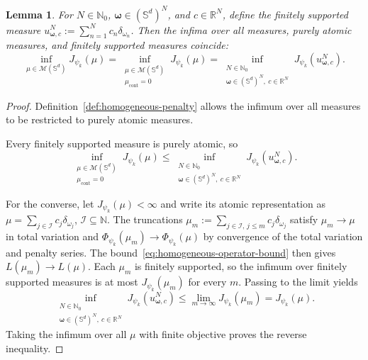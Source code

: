 \documentclass[11pt]{amsart}
\newtheorem{lemma}[theorem]{Lemma}
\theoremstyle{definition}
\theoremstyle{remark}
\DeclareMathOperator{\cont}{cont}
\begin{document}
\begin{lemma}
\label{lem:homogeneous_reduction}
For $N\in\mathbb N_0$, $\boldsymbol\omega\in(\mathbb S^d)^N$, and
$c\in\mathbb R^N$, define the finitely supported measure
$u^N_{\boldsymbol\omega,c}:=\sum_{n=1}^Nc_n\delta_{\omega_n}$.
Then the infima over all measures, purely atomic measures, and finitely
supported measures coincide:
\begin{equation}
\label{eq:homogeneous-infima}
	\inf_{\mu\in\mathcal M(\mathbb S^d)}J_{\psi_k}(\mu)
	=\inf_{\substack{\mu\in\mathcal M(\mathbb S^d)\\ \mu_{\cont}=0}}
	J_{\psi_k}(\mu)
	=\inf_{\substack{N\in\mathbb N_0\\
	\boldsymbol\omega\in(\mathbb S^d)^N,\ c\in\mathbb R^N}}
	J_{\psi_k}(u^N_{\boldsymbol\omega,c}).
\end{equation}
\end{lemma}
\begin{proof}
Definition~\ref{def:homogeneous-penalty} allows the infimum over all measures
to be restricted to purely atomic measures.

Every finitely supported measure is purely atomic, so
\begin{equation*}
	\inf_{\substack{\mu\in\mathcal M(\mathbb S^d)\\ \mu_{\cont}=0}}
	J_{\psi_k}(\mu)
	\le\inf_{\substack{N\in\mathbb N_0\\
	\boldsymbol\omega\in(\mathbb S^d)^N,\ c\in\mathbb R^N}}
	J_{\psi_k}(u^N_{\boldsymbol\omega,c}).
\end{equation*}

For the converse, let
$J_{\psi_k}(\mu)<\infty$ and write its atomic representation as
$\mu=\sum_{j\in\mathcal I}c_j\delta_{\omega_j}$, $\mathcal I\subseteq\mathbb N$.
The truncations $\mu_m:=\sum_{j\in\mathcal I,\,j\le m}c_j\delta_{\omega_j}$
satisfy $\mu_m\to\mu$ in total variation and
$\Phi_{\psi_k}(\mu_m)\to\Phi_{\psi_k}(\mu)$ by convergence of the
total variation and penalty series.
The bound~\eqref{eq:homogeneous-operator-bound} then gives $L(\mu_m)\to L(\mu)$.
Each $\mu_m$ is finitely supported, so the infimum over finitely supported
measures is at most $J_{\psi_k}(\mu_m)$ for every $m$. Passing to the limit yields
\begin{equation*}
	\inf_{\substack{N\in\mathbb N_0\\
	\boldsymbol\omega\in(\mathbb S^d)^N,\ c\in\mathbb R^N}}
	J_{\psi_k}(u^N_{\boldsymbol\omega,c})
	\le\lim_{m\to\infty}J_{\psi_k}(\mu_m)
	=J_{\psi_k}(\mu).
\end{equation*}
Taking the infimum over all $\mu$ with finite objective proves the reverse
inequality.
\end{proof}
\end{document}
